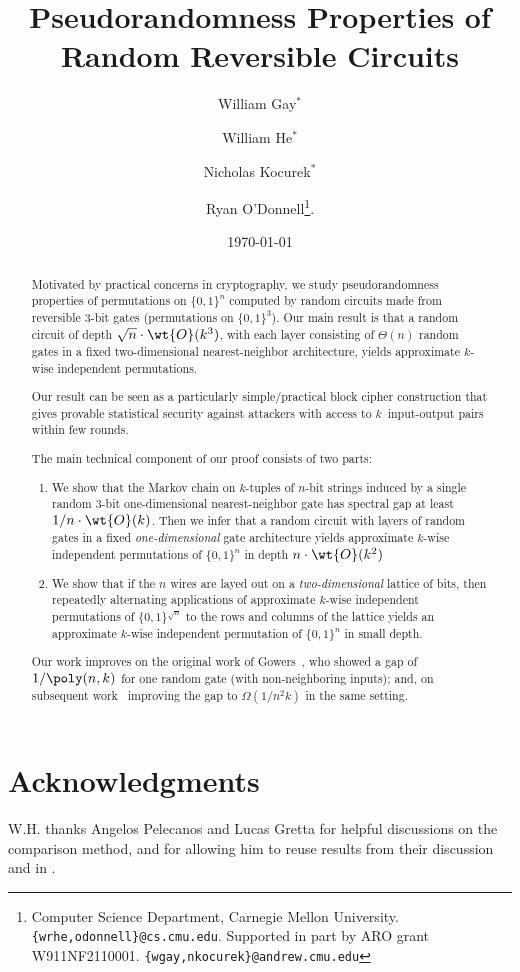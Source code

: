 \documentclass[11pt]{article}
\title{Pseudorandomness Properties of Random Reversible Circuits}
\author{
William Gay${}^*$
\and
 William He${}^*$
 \and
 Nicholas Kocurek${}^*$
 \and 
Ryan O'Donnell\thanks{Computer Science Department, Carnegie Mellon University. \texttt{\{wrhe,odonnell\}@cs.cmu.edu}. Supported in part by ARO grant W911NF2110001. \texttt{\{wgay,nkocurek\}@andrew.cmu.edu}}.}
\date{\small\today}
\begin{document}
\maketitle
\allowdisplaybreaks
\begin{abstract}
    Motivated by practical concerns in cryptography, we study pseudorandomness properties of permutations on $\{0,1\}^n$ computed by random circuits made from reversible $3$-bit gates (permutations on $\{0,1\}^3$). Our main result is that a random circuit of depth $\sqrt{n} \cdot \wt{O}(k^3)$, with each layer consisting of $\Theta(n)$ random gates in a fixed two-dimensional nearest-neighbor architecture, yields approximate $k$-wise independent permutations. 

    Our result can be seen as a particularly simple/practical block cipher construction that gives provable statistical security against attackers with access to $k$~input-output pairs within few rounds. 
    
    The main technical component of our proof consists of two parts:
    \begin{enumerate}
        \item We show that the Markov chain on $k$-tuples of $n$-bit strings induced by a single random $3$-bit one-dimensional nearest-neighbor gate has spectral gap at least $1/n \cdot \wt{O}(k)$. Then we infer that a random circuit with layers of random gates in a fixed \textit{one-dimensional} gate architecture yields approximate $k$-wise independent permutations of $\{0,1\}^n$ in depth $n\cdot \wt{O}(k^2)$
        \item We show that if the $n$ wires are layed out on a \textit{two-dimensional} lattice of bits, then repeatedly alternating applications of approximate $k$-wise independent permutations of $\{0,1\}^{\sqrt n}$ to the rows and columns of the lattice yields an approximate $k$-wise independent permutation of $\{0,1\}^n$ in small depth.
    \end{enumerate}
    Our work improves on the original work of Gowers~\cite{gowers1996almost}, who showed a gap of $1/\poly(n,k)$ for one random gate (with non-neighboring inputs); and, on subsequent work~\cite{hoory2005simple,brodsky2008simple} improving the gap to $\Omega(1/n^2k)$ in the same setting.
\end{abstract}

\newpage

\tableofcontents










\section*{Acknowledgments}
W.H. thanks Angelos Pelecanos and Lucas Gretta for helpful discussions on the comparison method, and for allowing him to reuse results from their discussion and \cite{gretta2024more} in .





\appendix


\end{document}
